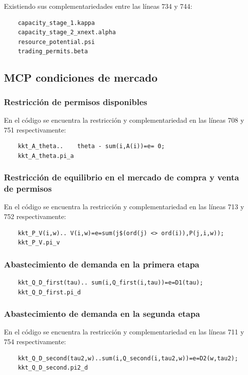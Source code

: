 Existiendo sus complementariedades entre las líneas 734 y 744:

\begin{verbatim}
    capacity_stage_1.kappa
    capacity_stage_2_xnext.alpha
    resource_potential.psi
    trading_permits.beta
\end{verbatim}

\subsection{MCP condiciones de mercado}

\subsubsection{Restricción de permisos disponibles}
En el código se encuentra la restricción y complementariedad en las líneas 708 y 751 respectivamente: 
\begin{verbatim}
    kkt_A_theta..    theta - sum(i,A(i))=e= 0;
    kkt_A_theta.pi_a
\end{verbatim}

\subsubsection{Restricción de equilibrio en el mercado de compra y venta de permisos}
En el código se encuentra la restricción y complementariedad en las líneas 713 y 752 respectivamente: 
\begin{verbatim}
    kkt_P_V(i,w).. V(i,w)=e=sum(j$(ord(j) <> ord(i)),P(j,i,w));
    kkt_P_V.pi_v 
\end{verbatim}

\subsubsection{Abastecimiento de demanda en la primera etapa}
\begin{verbatim}
    kkt_Q_D_first(tau).. sum(i,Q_first(i,tau))=e=D1(tau);
    kkt_Q_D_first.pi_d
\end{verbatim}

\subsubsection{Abastecimiento de demanda en la segunda etapa}
En el código se encuentra la restricción y complementariedad en las líneas 711 y 754 respectivamente: 
\begin{verbatim}
    kkt_Q_D_second(tau2,w)..sum(i,Q_second(i,tau2,w))=e=D2(w,tau2);
    kkt_Q_D_second.pi2_d
\end{verbatim}


